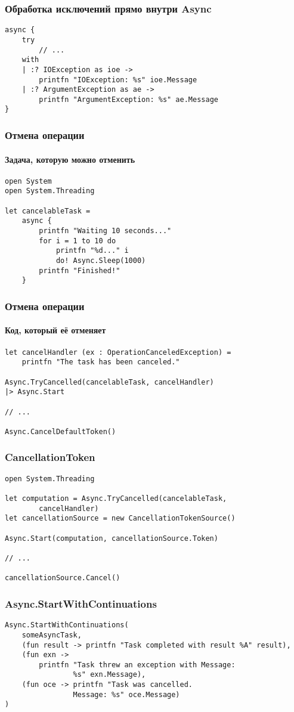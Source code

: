 \documentclass[xetex,mathserif,serif]{beamer}
\begin{document}
	\begin{frame}[fragile]
		\frametitle{Обработка исключений прямо внутри Async}
		\begin{verbatim}
async {
    try
        // ...
    with
    | :? IOException as ioe ->
        printfn "IOException: %s" ioe.Message
    | :? ArgumentException as ae ->
        printfn "ArgumentException: %s" ae.Message
}
		\end{verbatim}
	\end{frame}

	\begin{frame}[fragile]
		\frametitle{Отмена операции}
		\framesubtitle{Задача, которую можно отменить}
		\begin{verbatim}
open System
open System.Threading

let cancelableTask =
    async {
        printfn "Waiting 10 seconds..."
        for i = 1 to 10 do
            printfn "%d..." i
            do! Async.Sleep(1000)
        printfn "Finished!"
    }
		\end{verbatim}
	\end{frame}

	\begin{frame}[fragile]
		\frametitle{Отмена операции}
		\framesubtitle{Код, который её отменяет}
		\begin{verbatim}
let cancelHandler (ex : OperationCanceledException) =
    printfn "The task has been canceled."

Async.TryCancelled(cancelableTask, cancelHandler)
|> Async.Start

// ...

Async.CancelDefaultToken()
		\end{verbatim}
	\end{frame}

	\begin{frame}[fragile]
		\frametitle{CancellationToken}
		\begin{verbatim}
open System.Threading

let computation = Async.TryCancelled(cancelableTask, 
        cancelHandler)
let cancellationSource = new CancellationTokenSource()

Async.Start(computation, cancellationSource.Token)

// ...

cancellationSource.Cancel()
		\end{verbatim}
	\end{frame}

	\begin{frame}[fragile]
		\frametitle{Async.StartWithContinuations}
		\begin{verbatim}
Async.StartWithContinuations(
    someAsyncTask,
    (fun result -> printfn "Task completed with result %A" result),
    (fun exn -> 
        printfn "Task threw an exception with Message: 
                %s" exn.Message),
    (fun oce -> printfn "Task was cancelled. 
                Message: %s" oce.Message)
)
		\end{verbatim}
	\end{frame}
\end{document}
